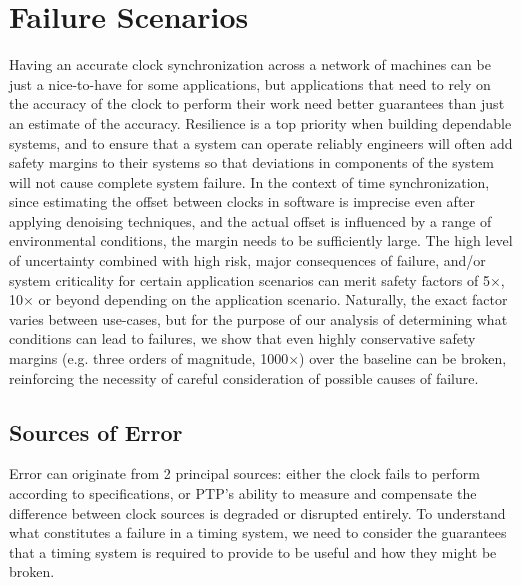 \newcommand{\safetyMargin}{1000$\times$}

\section{Failure Scenarios}
\label{sec:failure_scenarios}

Having an accurate clock synchronization across a network of machines can be just a nice-to-have for some applications, but applications that need to rely on the accuracy of the clock to perform their work need better guarantees than just an estimate of the accuracy.
Resilience is a top priority when building dependable systems, and to ensure that a system can operate reliably engineers will often add safety margins to their systems so that deviations in components of the system will not cause complete system failure.
In the context of time synchronization, since estimating the offset between clocks in software is imprecise even after applying denoising techniques, and the actual offset is influenced by a range of environmental conditions, the margin needs to be sufficiently large.
The high level of uncertainty combined with high risk, major consequences of failure, and/or system criticality for certain application scenarios can merit safety factors of 5$\times$, 10$\times$ or beyond depending on the application scenario.
Naturally, the exact factor varies between use-cases, but for the purpose of our analysis of determining what conditions can lead to failures, we show that even highly conservative safety margins (e.g. three orders of magnitude, \safetyMargin) over the baseline can be broken, reinforcing the necessity of careful consideration of possible causes of failure.

\subsection{Sources of Error}
Error can originate from 2 principal sources: either the clock fails to perform according to specifications, or PTP's ability to measure and compensate the difference between clock sources is degraded or disrupted entirely. To understand what constitutes a failure in a timing system, we need to consider the guarantees that a timing system is required to provide to be useful and how they might be broken.

